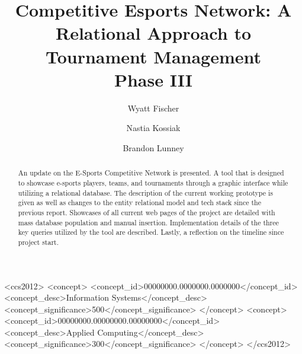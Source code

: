 \documentclass[sigconf]{acmart}
\begin{document}
\title{Competitive Esports Network: A Relational Approach to
Tournament Management \\ Phase III}

\author{Wyatt Fischer}

\author{Nastia Kossiak}
\author{Brandon Lunney}

\renewcommand{\shortauthors}{Fischer, Kossiak, and Lunney}

\begin{abstract}
  An update on the E-Sports Competitive Network is presented. A tool that is designed to showcase e-sports players, teams, and tournaments through a graphic interface while utilizing a relational database. The description of the current working prototype is given as well as changes to the entity relational model and tech stack since the previous report. Showcases of all current web pages of the project are detailed with mass database population and manual insertion. Implementation details of the three key queries utilized by the tool are described. Lastly, a reflection on the timeline since project start.
\end{abstract}

\begin{CCSXML}
<ccs2012>
 <concept>
  <concept_id>00000000.0000000.0000000</concept_id>
  <concept_desc>Information Systems</concept_desc>
  <concept_significance>500</concept_significance>
 </concept>
 <concept>
  <concept_id>00000000.00000000.00000000</concept_id>
  <concept_desc>Applied Computing</concept_desc>
  <concept_significance>300</concept_significance>
 </concept>
</ccs2012>
\end{CCSXML}
\end{document}
